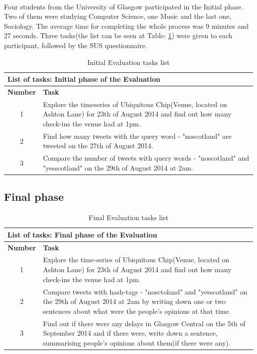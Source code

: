 \documentclass{l4proj}
\begin{document}
\paragraph{}
Four students from the University of Glasgow participated in the Initial phase. Two of them were studying Computer Science, one Music and the last one, Sociology. The average time for completing the whole process was 9 minutes and 27 seconds. Three tasks(the list can be seen at Table: \ref{tab:initialevaltasks}) were given to each participant, followed by the SUS questionnaire.  

\begin{table}[ht]
	\centering
	\begin{adjustbox}{width=1\textwidth}
		\begin{tabular}{|c|p{14cm}|}\hline
			\multicolumn{2}{|l|}{\textbf{List of tasks: Initial phase of the Evaluation}} \\\hline
			\textbf{Number} & \textbf{Task} \\ \hline
			1
			&
			Explore the timeseries of Ubiquitous Chip(Venue, located on Ashton Lane) for 23th of August 2014 and find out how many check-ins the venue had at 1pm.
			\tabularnewline\hline
			2
			&
			Find how many tweets with the query word - "noscotland" are tweeted on the 27th of August 2014.
			\tabularnewline\hline
			3
			&
			Compare the number of tweets with query words - "noscotland" and "yesscotland" on the 29th of August 2014 at 2am.
			\tabularnewline\hline
		\end{tabular}
	\end{adjustbox}
	\caption{Initial Evaluation tasks list}
	\label{tab:initialevaltasks}
\end{table}

\subsection{Final phase}


\begin{table}[ht]
	\centering
	\begin{adjustbox}{width=1\textwidth}
		\begin{tabular}{|c|p{14cm}|}\hline
			\multicolumn{2}{|l|}{\textbf{List of tasks: Final phase of the Evaluation}} \\\hline
			\textbf{Number} & \textbf{Task} \\ \hline
			1
			&
			Explore the time-series of Ubiquitous Chip(Venue, located on Ashton Lane) for 23th of August 2014 and find out how many check-ins the venue had at 1pm.
			\tabularnewline\hline
			2
			&
			Compare tweets with hash-tags - "nosctoland" and "yesscotland" on the 29th of August 2014 at 2am by writing down one or two sentences about what were the people's opinions at that time.
			\tabularnewline\hline
			3
			&
			Find out if there were any delays in Glasgow Central on the 5th of September 2014 and if there were, write down a sentence, summarising people's opinions about them(if there were any).
			\tabularnewline\hline
		\end{tabular}
	\end{adjustbox}
	\caption{Final Evaluation tasks list}
	\label{tab:finalevaltasks}
\end{table}
\end{document}
